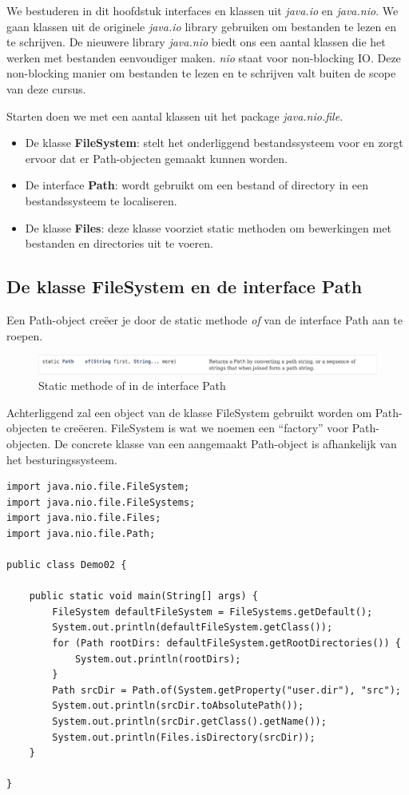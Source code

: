 \documentclass{tstextbook}
\begin{document}
We bestuderen in dit hoofdstuk interfaces en klassen uit \textit{java.io} en \textit{java.nio}. 
We gaan klassen uit de originele \textit{java.io} library gebruiken om bestanden te lezen en te schrijven. De nieuwere library \textit{java.nio} biedt ons een aantal klassen die het werken met bestanden eenvoudiger maken. \textit{nio} staat voor non-blocking IO. Deze non-blocking manier om bestanden te lezen en te schrijven valt buiten de scope van deze cursus.

Starten doen we met een aantal klassen uit het package \textit{java.nio.file}.

\begin{itemize}
\item De klasse \textbf{FileSystem}: stelt het onderliggend bestandssysteem voor en zorgt ervoor dat er Path-objecten gemaakt kunnen worden.
\item De interface \textbf{Path}: wordt gebruikt om een bestand of directory in een bestandssysteem te localiseren.
\item De klasse \textbf{Files}: deze klasse voorziet static methoden om bewerkingen met bestanden en directories uit te voeren.
\end{itemize}

\subsection{De klasse FileSystem en de interface Path}

Een Path-object cre\"eer je door de static methode \textit{of} van de interface Path aan te roepen. 

\begin{figure}[H]
  \includegraphics[width=\linewidth]{images/h8/path_of.png}
  \caption{Static methode of in de interface Path}
  \label{fig:paths}
\end{figure}

Achterliggend zal een object van de klasse FileSystem gebruikt worden om Path-objecten te cre\"eeren. FileSystem is wat we noemen een ``factory'' voor Path-objecten. De concrete klasse van een aangemaakt Path-object is afhankelijk van het besturingssysteem.

\begin{lstlisting}
import java.nio.file.FileSystem;
import java.nio.file.FileSystems;
import java.nio.file.Files;
import java.nio.file.Path;

public class Demo02 {

	public static void main(String[] args) {
		FileSystem defaultFileSystem = FileSystems.getDefault();
		System.out.println(defaultFileSystem.getClass());
		for (Path rootDirs: defaultFileSystem.getRootDirectories()) {
			System.out.println(rootDirs);
		}
		Path srcDir = Path.of(System.getProperty("user.dir"), "src");
		System.out.println(srcDir.toAbsolutePath());
		System.out.println(srcDir.getClass().getName());
		System.out.println(Files.isDirectory(srcDir));
	}

}
\end{lstlisting}
\end{document}
